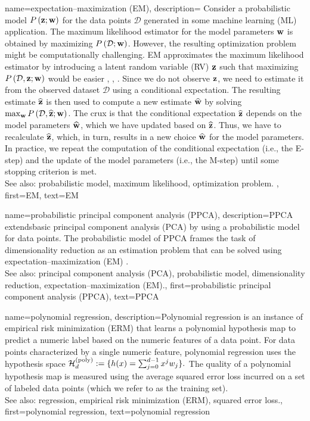 {
{name={expectation–maximization (EM)}, 
	description={ 
		Consider a probabilistic model $P\left({\bf z}; {\bf w}\right)$ for the data points $\mathcal{D}$ generated in some 
		machine learning (ML) application. The maximum likelihood estimator for the model parameters ${\bf w}$ is obtained by maximizing 
		$P\left(\mathcal{D}; {\bf w}\right)$. However, the resulting optimization problem might be computationally 
		challenging. EM approximates the maximum likelihood estimator by introducing a latent 
		random variable (RV) ${\bf z}$ such that maximizing $P\left(\mathcal{D},{\bf z}; {\bf w}\right)$ would be easier 
		\cite{hastie01statisticallearning}, \cite{BishopBook}, \cite{GraphModExpFamVarInfWainJor}. Since we 
		do not observe ${\bf z}$, we need to estimate it from the observed dataset $\mathcal{D}$ 
		using a conditional expectation. The resulting estimate $\widehat{{\bf z}}$ is then used to 
		compute a new estimate $\widehat{{\bf w}}$ by solving $\max_{{\bf w}} P\left(\mathcal{D}, \widehat{{\bf z}}; {\bf w}\right)$. 
		The crux is that the conditional expectation $\widehat{{\bf z}}$ depends on the model parameters $\widehat{{\bf w}}$, 
		which we have updated based on $\widehat{{\bf z}}$. Thus, we have to recalculate $\widehat{{\bf z}}$, 
		which, in turn, results in a new choice $\widehat{{\bf w}}$ for the model parameters. In practice, 
		we repeat the computation of the conditional expectation (i.e., the E-step) and the update 
		of the model parameters (i.e., the M-step) until some stopping criterion is met. 
				\\
		See also: probabilistic model, maximum likelihood, optimization problem. },
	first={EM},
	text={EM}
}


{name={probabilistic principal component analysis (PPCA)}, 
	description={PPCA 
		extends\linebreak basic principal component analysis (PCA) by using a probabilistic model for data points. 
		The probabilistic model of PPCA frames the task of dimensionality reduction 
		as an estimation problem that can be solved using expectation–maximization (EM) \cite{TippingProbPCA}.
				\\
		See also: principal component analysis (PCA), probabilistic model, dimensionality reduction, expectation–maximization (EM).},
	first={probabilistic principal component analysis (PPCA)},
	text={PPCA}
}
	
{name={polynomial regression}, 
	description={Polynomial 
		regression is an instance of empirical risk minimization (ERM) that learns a polynomial hypothesis 
		map to predict a numeric label based on the numeric features of a data point. 
		 For data points characterized by a single numeric feature, polynomial regression uses the hypothesis space 
		$\mathcal{H}^{(\rm poly)}_{d} := \{ h(x) = \sum_{j=0}^{d-1} x^{j} w_{j} \}.$
		The quality of a polynomial hypothesis map is measured using the average squared error loss 
		incurred on a set of labeled data points (which we refer to as the training set).
					\\
		See also: regression, empirical risk minimization (ERM), squared error loss.},
	first={polynomial regression},
	text={polynomial regression}
}

}
